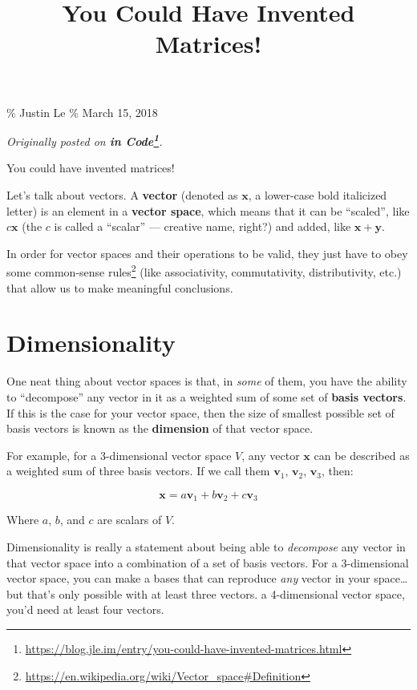 \documentclass[]{article}
\title{You Could Have Invented Matrices!}
\renewcommand{\href}[2]{#2\footnote{\url{#1}}}
\begin{document}
\maketitle

\% Justin Le \% March 15, 2018

\emph{Originally posted on
\textbf{\href{https://blog.jle.im/entry/you-could-have-invented-matrices.html}{in
Code}}.}

You could have invented matrices!

Let's talk about vectors. A \textbf{vector} (denoted as \(\mathbf{x}\), a
lower-case bold italicized letter) is an element in a \textbf{vector space},
which means that it can be ``scaled'', like \(c \mathbf{x}\) (the \(c\) is
called a ``scalar'' --- creative name, right?) and added, like
\(\mathbf{x} + \mathbf{y}\).

In order for vector spaces and their operations to be valid, they just have to
obey some
\href{https://en.wikipedia.org/wiki/Vector_space\#Definition}{common-sense
rules} (like associativity, commutativity, distributivity, etc.) that allow us
to make meaningful conclusions.

\section{Dimensionality}\label{dimensionality}

One neat thing about vector spaces is that, in \emph{some} of them, you have the
ability to ``decompose'' any vector in it as a weighted sum of some set of
\textbf{basis vectors}. If this is the case for your vector space, then the size
of smallest possible set of basis vectors is known as the \textbf{dimension} of
that vector space.

For example, for a 3-dimensional vector space \(V\), any vector \(\mathbf{x}\)
can be described as a weighted sum of three basis vectors. If we call them
\(\mathbf{v}_1\), \(\mathbf{v}_2\), \(\mathbf{v}_3\), then:

\[
\mathbf{x} = a \mathbf{v}_1 + b \mathbf{v}_2 + c \mathbf{v}_3
\]

Where \(a\), \(b\), and \(c\) are scalars of \(V\).

Dimensionality is really a statement about being able to \emph{decompose} any
vector in that vector space into a combination of a set of basis vectors. For a
3-dimensional vector space, you can make a bases that can reproduce \emph{any}
vector in your space\ldots but that's only possible with at least three vectors.
a 4-dimensional vector space, you'd need at least four vectors.
\end{document}

